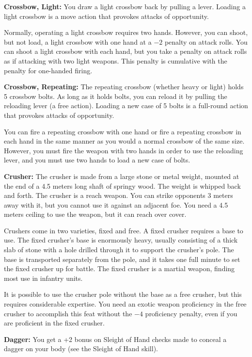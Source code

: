 \textbf{Crossbow, Light:} You draw a light crossbow back by pulling a lever. Loading a light crossbow is a move action that provokes attacks of opportunity.

Normally, operating a light crossbow requires two hands. However, you can shoot, but not load, a light crossbow with one hand at a $-2$ penalty on attack rolls. You can shoot a light crossbow with each hand, but you take a penalty on attack rolls as if attacking with two light weapons. This penalty is cumulative with the penalty for one-handed firing. 

\textbf{Crossbow, Repeating:} The repeating crossbow (whether heavy or light) holds 5 crossbow bolts. As long as it holds bolts, you can reload it by pulling the reloading lever (a free action). Loading a new case of 5 bolts is a full-round action that provokes attacks of opportunity.

You can fire a repeating crossbow with one hand or fire a repeating crossbow in each hand in the same manner as you would a normal crossbow of the same size. However, you must fire the weapon with two hands in order to use the reloading lever, and you must use two hands to load a new case of bolts. 

\textbf{Crusher:} The crusher is made from a large stone or metal weight, mounted at the end of a 4.5 meters long shaft of springy wood. The weight is whipped back and forth. The crusher is a reach weapon. You can strike opponents 3 meters away with it, but you cannot use it against an adjacent foe. You need a 4.5 meters ceiling to use the weapon, but it can reach over cover.

Crushers come in two varieties, fixed and free. A fixed crusher requires a base to use. The fixed crusher's base is enormously heavy, usually consisting of a thick slab of stone with a hole drilled through it to support the crusher's pole. The base is transported separately from the pole, and it takes one full minute to set the fixed crusher up for battle. The fixed crusher is a martial weapon, finding most use in infantry units.

It is possible to use the crusher pole without the base as a free crusher, but this requires considerable expertise. You need an exotic weapon proficiency in the free crusher to accomplish this feat without the $-4$ proficiency penalty, even if you are proficient in the fixed crusher.

\textbf{Dagger:} You get a +2 bonus on Sleight of Hand checks made to conceal a dagger on your body (see the Sleight of Hand skill). 

